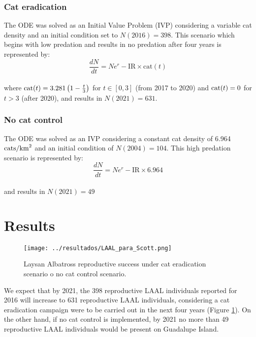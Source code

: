 \documentclass{article}
\begin{document}
\subsubsection*{Cat eradication}
The ODE was solved as an Initial Value Problem (IVP) considering a variable cat density and an initial condition set to $N(2016)=398$. This scenario which begins with low predation and results in no predation after four years is represented by:
\begin{equation}
\frac{dN}{dt} = N  e^{r}-\text{IR}\times \text{cat}(t)
\end{equation}
\\
where $\textnormal{cat}(t) = 3.281\left(1-\frac{t}{3}\right)$ for $t\in \left[0,3\right]$ (from 2017 to 2020) and $\textnormal{cat}(t) = 0$ for $t>3$ (after 2020),
and results in $N(2021)=631$. \\


\subsubsection*{No cat control}
The ODE was solved as an IVP considering a constant cat density of 6.964 $\textnormal{cats}/\textnormal{km}^{2}$ and an initial condition of $N(2004)=104$. This high predation scenario is represented by:
\begin{equation}
\frac{dN}{dt} = N  e^{r}-\text{IR} \times 6.964
\end{equation}
\\
and results in $N(2021)=49$

\section*{Results}
\begin{figure}[H]
\centering
\texttt{[image: ../resultados/LAAL\_para\_Scott.png]}
\caption{Laysan Albatross reproductive success under cat eradication scenario o no cat control scenario.}\label{4scenarios}
\end{figure}

We expect that by 2021, the 398 reproductive LAAL individuals reported for 2016 will increase to 631 reproductive LAAL individuals, considering a cat eradication campaign were to be carried out in the next four years (Figure \ref{4scenarios}). On the other hand, if no cat control is implemented, by 2021 no more than 49 reproductive LAAL individuals would be present on Guadalupe Island.
\end{document}
